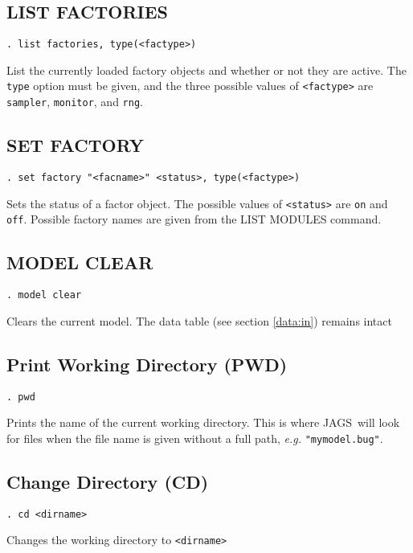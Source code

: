 \documentclass[11pt, a4paper, titlepage]{report}
\newcommand{\JAGS}{\textsf{JAGS}}
\begin{document}
\subsection{LIST FACTORIES}
\label{list:factories}
\begin{verbatim}
. list factories, type(<factype>)
\end{verbatim}
List the currently loaded factory objects and whether or not they are
active.  The \verb+type+ option must be given, and the three possible values
of \verb+<factype>+ are \verb+sampler+, \verb+monitor+, and \verb+rng+.

\subsection{SET FACTORY}
\label{set:factory}
\begin{verbatim}
. set factory "<facname>" <status>, type(<factype>)
\end{verbatim}
Sets the status of a factor object. The possible values of \verb+<status>+
are \verb+on+ and \verb+off+. Possible factory names are given from the
LIST MODULES command.

\subsection{MODEL CLEAR}
\label{model:clear}
\begin{verbatim}
. model clear
\end{verbatim}
Clears the current model.  The data table (see section \ref{data:in})
remains intact

\subsection{Print Working Directory (PWD)}
\begin{verbatim}
. pwd
\end{verbatim}
Prints the name of the current working directory. This is where \JAGS\
will look for files when the file name is given without a full path, 
{\em e.g.} \verb+"mymodel.bug"+.

\subsection{Change Directory (CD)}
\begin{verbatim}
. cd <dirname>
\end{verbatim}
Changes the working directory to \texttt{<dirname>}
\end{document}
